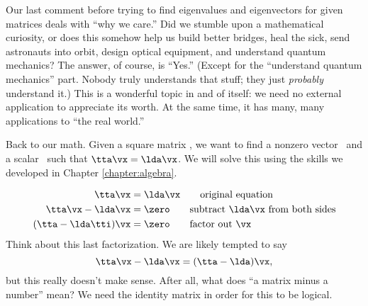 Our last comment before trying to find eigenvalues and eigenvectors for given matrices deals with ``why we care.'' Did we stumble upon a mathematical curiosity, or does this somehow help us build better bridges, heal the sick, send astronauts into orbit, design optical equipment, and understand quantum mechanics? The answer, of course, is ``Yes.'' (Except for the ``understand quantum mechanics'' part. Nobody truly understands that stuff; they just \textit{probably} understand it.) This is a wonderful topic in and of itself: we need no external application to appreciate its worth. At the same time, it has many, many applications to ``the real world.''


Back to our math. Given a square matrix \tta, we want to find a nonzero vector \vx\ and a scalar \lda\ such that $\tta\vx = \lda\vx$. We will solve this using the skills we developed in Chapter \ref{chapter:algebra}.

\begin{align*}
\tta\vx & =  \lda\vx \tag*{original equation}\\
\tta\vx - \lda\vx & = \zero \tag*{subtract $\lda\vx$ from both sides}\\
(\tta-\lda\tti)\vx & = \zero \tag*{factor out \vx}\\
\end{align*}
Think about this last factorization. We are likely tempted to say 
\[
\tta\vx-\lda\vx = (\tta-\lda)\vx,
\]
but this really doesn't make sense. After all, what does ``a matrix minus a number'' mean? We need the identity matrix in order for this to be logical. 

